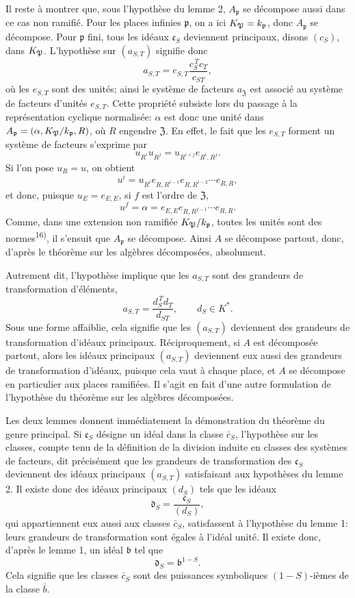 Il reste à montrer que, sous l'hypothèse du lemme 2, \(A_{\mathfrak p}\) se décompose aussi dans ce cas non ramifié. Pour les places infinies \(\mathfrak p\), on a ici \(K_\mathfrak P=k_{\mathfrak p}\), donc \(A_{\mathfrak p}\) se décompose. Pour \(\mathfrak p\) fini, tous les idéaux \(\mathfrak c_S\) deviennent principaux, disons \((c_S)\), dans \(K_\mathfrak P\). L'hypothèse sur \((a_{S,T})\) signifie donc
\[
        a_{S,T}=e_{S,T}\frac{c_S^{\,T}c_T}{c_{ST}},
\]
où les \(e_{S,T}\) sont des unités; ainsi le système de facteurs \(a_{\mathfrak Z}\) est associé au système de facteurs d'unités \(e_{S,T}\). Cette propriété subsiste lors du passage à la représentation cyclique normalisée: \(\alpha\) est donc une unité dans \(A_{\mathfrak p}=(\alpha,K_\mathfrak P/k_{\mathfrak p},R)\), où \(R\) engendre \(\mathfrak Z\). En effet, le fait que les \(e_{S,T}\) forment un système de facteurs s'exprime par
\[
        u_{R^i}u_{R^j}=u_{R^{i+j}}e_{R^i,R^j}.
\]
Si l'on pose \(u_R=u\), on obtient
\[
        u^i=u_{R^i}e_{R,R^{i-1}}e_{R,R^{i-2}}\cdots e_{R,R},
\]
et donc, puisque \(u_E=e_{E,E}\), si \(f\) est l'ordre de \(\mathfrak Z\),
\[
        u^f=\alpha=e_{E,E}e_{R,R^{f-1}}\cdots e_{R,R}.
\]
Comme, dans une extension non ramifiée \(K_\mathfrak P/k_{\mathfrak p}\), toutes les unités sont des normes\textsuperscript{16)}, il s'ensuit que \(A_{\mathfrak p}\) se décompose. Ainsi \(A\) se décompose partout, donc, d'après le théorème sur les algèbres décomposées, absolument.

Autrement dit, l'hypothèse implique que les \(a_{S,T}\) sont des grandeurs de transformation d'éléments,
\[
        a_{S,T}=\frac{d_S^{\,T}d_T}{d_{ST}},
        \qquad d_S\in K^*.
\]
Sous une forme affaiblie, cela signifie que les \((a_{S,T})\) deviennent des grandeurs de transformation d'idéaux principaux. Réciproquement, si \(A\) est décomposée partout, alors les idéaux principaux \((a_{S,T})\) deviennent eux aussi des grandeurs de transformation d'idéaux, puisque cela vaut à chaque place, et \(A\) se décompose en particulier aux places ramifiées. Il s'agit en fait d'une autre formulation de l'hypothèse du théorème sur les algèbres décomposées.

Les deux lemmes donnent immédiatement la démonstration du théorème du genre principal. Si \(\mathfrak c_S\) désigne un idéal dans la classe \(\bar c_S\), l'hypothèse sur les classes, compte tenu de la définition de la division induite en classes des systèmes de facteurs, dit précisément que les grandeurs de transformation des \(\mathfrak c_S\) deviennent des idéaux principaux \((a_{S,T})\) satisfaisant aux hypothèses du lemme 2. Il existe donc des idéaux principaux \((d_S)\) tels que les idéaux
\[
        \mathfrak d_S=\frac{\mathfrak c_S}{(d_S)},
\]
qui appartiennent eux aussi aux classes \(\bar c_S\), satisfassent à l'hypothèse du lemme 1: leurs grandeurs de transformation sont égales à l'idéal unité. Il existe donc, d'après le lemme 1, un idéal \(\mathfrak b\) tel que
\[
        \mathfrak d_S=\mathfrak b^{1-S}.
\]
Cela signifie que les classes \(\bar c_S\) sont des puissances symboliques \((1-S)\)-ièmes de la classe \(\bar b\).


